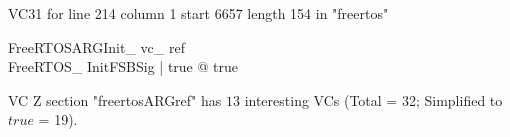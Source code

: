 \documentclass{article}
\begin{document}
VC31 for line 214 column 1 start 6657 length 154 in "freertos"
\begin{theorem}{ FreeRTOSARGInit\_ vc\_ ref}\\
 \exists FreeRTOS\_ InitFSBSig | true @ true \\

\end{theorem}



 VC Z section "freertosARGref" has $13$ interesting VCs (Total = 32; Simplified to $true$ = 19).



\end{document}
